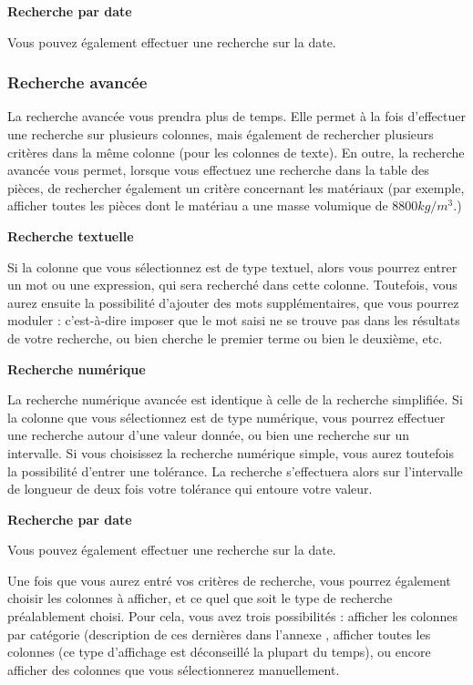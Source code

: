 \documentclass[12pt,a4paper]{article}
\begin{document}
            \medskip
            \textbf{Recherche par date}

            Vous pouvez également effectuer une recherche sur la date.

        \subsubsection{Recherche avancée}
            La recherche avancée vous prendra plus de temps. Elle permet à la fois d'effectuer une recherche sur plusieurs colonnes,
            mais également de rechercher plusieurs critères dans la même colonne (pour les colonnes de texte).
            En outre, la recherche avancée vous permet, lorsque vous effectuez une recherche dans la table des pièces, de rechercher
            également un critère concernant les matériaux (par exemple, afficher toutes les pièces dont le matériau a une masse volumique
            de $8800kg/m^{3}$.)

            \medskip
            \textbf{Recherche textuelle}

            Si la colonne que vous sélectionnez est de type textuel, alors vous pourrez entrer un mot ou une expression, qui sera recherché
            dans cette colonne. Toutefois, vous aurez ensuite la possibilité d'ajouter des mots supplémentaires, que vous pourrez moduler :
            c'est-à-dire imposer que le mot saisi ne se trouve pas dans les résultats de votre recherche, ou bien cherche le premier terme
            ou bien le deuxième, etc.

            \medskip
            \textbf{Recherche numérique}

            La recherche numérique avancée est identique à celle de la recherche simplifiée.
            Si la colonne que vous sélectionnez est de type numérique, vous pourrez effectuer une recherche autour d'une valeur donnée,
            ou bien une recherche sur un intervalle. Si vous choisissez la recherche numérique simple, vous aurez toutefois
            la possibilité d'entrer une tolérance. La recherche s'effectuera alors sur l'intervalle de longueur de deux fois votre tolérance
            qui entoure votre valeur.

            \medskip
            \textbf{Recherche par date}

            Vous pouvez également effectuer une recherche sur la date.

        \bigskip
        Une fois que vous aurez entré vos critères de recherche, vous pourrez
        également choisir les colonnes à afficher, et ce quel que soit le type
        de recherche préalablement choisi. Pour cela, vous avez trois
        possibilités : afficher les colonnes par catégorie (description de ces
        dernières dans l'annexe , afficher toutes les colonnes (ce type
        d'affichage est déconseillé la plupart du temps), ou encore afficher des
        colonnes que vous sélectionnerez manuellement.
\end{document}
